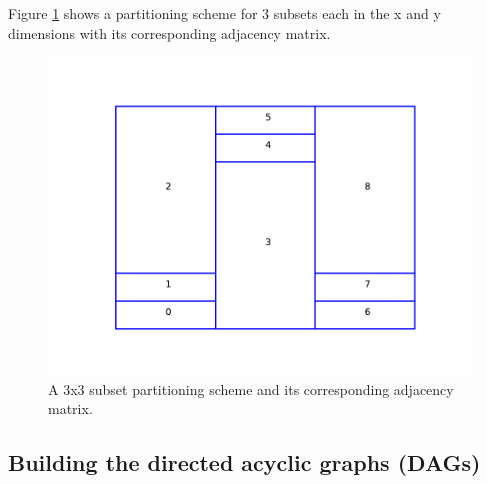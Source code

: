 Figure \ref{25basematrix} shows a partitioning scheme for 3 subsets each in the x and y dimensions with its corresponding adjacency matrix.

\begin{figure}[H]
\begin{minipage}[c]{0.5\textwidth}
\centering
\includegraphics[scale=0.55]{../../figures/boundaries_worst.pdf}
\end{minipage}
\begin{minipage}[c]{0.6\textwidth}
\centering
{}
\end{minipage}
\caption{A 3x3 subset partitioning scheme and its corresponding adjacency matrix.}
\label{25basematrix}
\end{figure}

\subsection{Building the directed acyclic graphs (DAGs)}

